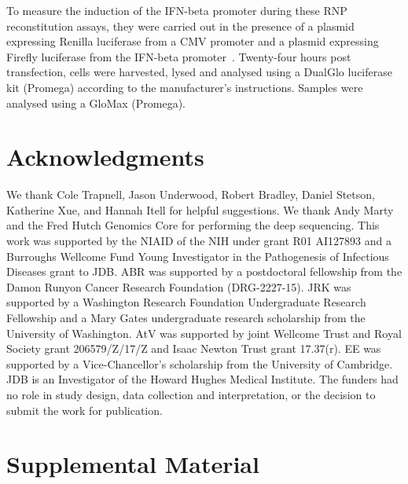 \documentclass[]{asm-article}
\begin{document}
To measure the induction of the IFN-beta promoter during these RNP reconstitution assays, they were carried out in the presence of a plasmid expressing Renilla luciferase from a CMV promoter and a plasmid expressing Firefly luciferase from the IFN-beta promoter~\cite{velthuis2018mini}.
Twenty-four hours post transfection, cells were harvested, lysed and analysed using a DualGlo luciferase kit (Promega) according to the manufacturer’s instructions.
Samples were analysed using a GloMax (Promega).


\normalsize

\section{Acknowledgments}
We thank Cole Trapnell, Jason Underwood, Robert Bradley, Daniel Stetson, Katherine Xue, and Hannah Itell for helpful suggestions.
We thank Andy Marty and the Fred Hutch Genomics Core for performing the deep sequencing.
This work was supported by the NIAID of the NIH under grant R01 AI127893 and a Burroughs Wellcome Fund Young Investigator in the Pathogenesis of Infectious Diseases grant to JDB.
ABR was supported by a postdoctoral fellowship from the Damon Runyon Cancer Research Foundation (DRG-2227-15).
JRK was supported by a Washington Research Foundation Undergraduate Research Fellowship and a Mary Gates undergraduate research scholarship from the University of Washington.
AtV was supported by joint Wellcome Trust and Royal Society grant 206579/Z/17/Z and Isaac Newton Trust grant 17.37(r).
EE was supported by a Vice-Chancellor's scholarship from the University of Cambridge.
JDB is an Investigator of the Howard Hughes Medical Institute.
The funders had no role in study design, data collection and interpretation, or the decision to submit the work for publication.



\newpage
\setcounter{page}{1}
\section{Supplemental Material}
\end{document}
